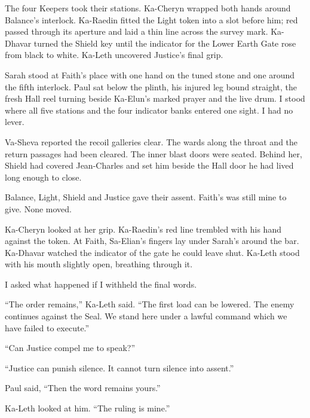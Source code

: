 The four Keepers took their stations. Ka-Cheryn wrapped both hands around Balance's interlock. Ka-Raedin fitted the Light token into a slot before him; red passed through its aperture and laid a thin line across the survey mark. Ka-Dhavar turned the Shield key until the indicator for the Lower Earth Gate rose from black to white. Ka-Leth uncovered Justice's final grip.\par

Sarah stood at Faith's place with one hand on the tuned stone and one around the fifth interlock. Paul sat below the plinth, his injured leg bound straight, the fresh Hall reel turning beside Ka-Elun's marked prayer and the live drum. I stood where all five stations and the four indicator banks entered one sight. I had no lever.\par

Va-Sheva reported the recoil galleries clear. The wards along the throat and the return passages had been cleared. The inner blast doors were seated. Behind her, Shield had covered Jean-Charles and set him beside the Hall door he had lived long enough to close.\par

Balance, Light, Shield and Justice gave their assent. Faith's was still mine to give. None moved.\par

Ka-Cheryn looked at her grip. Ka-Raedin's red line trembled with his hand against the token. At Faith, Sa-Elian's fingers lay under Sarah's around the bar. Ka-Dhavar watched the indicator of the gate he could leave shut. Ka-Leth stood with his mouth slightly open, breathing through it.\par

I asked what happened if I withheld the final words.\par

``The order remains,'' Ka-Leth said. ``The first load can be lowered. The enemy continues against the Seal. We stand here under a lawful command which we have failed to execute.''\par

``Can Justice compel me to speak?''\par

``Justice can punish silence. It cannot turn silence into assent.''\par

Paul said, ``Then the word remains yours.''\par

Ka-Leth looked at him. ``The ruling is mine.''\par


